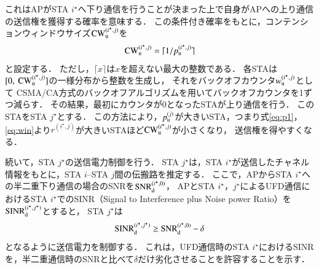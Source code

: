 \documentclass[master]{kuisthesis}		%
\begin{document}
			これはAPがSTA $i^{\star}$へ下り通信を行うことが決まった上で自身がAPへの上り通信の送信権を獲得する確率を意味する．
			この条件付き確率をもとに，コンテンションウィンドウサイズ${\rm CW}^{(i^{\star},j)}_{\rm u}$を
			\begin{equation}
				{\rm CW}^{(i^{\star},j)}_{\rm u} = \lceil 1/p_{\rm u}^{(i^{\star},j)} \rceil
			\end{equation}
			と設定する．
			ただし，$\lceil x \rceil$は$x$を超えない最大の整数である．
			各STAは$[0,\ {\rm CW}^{(i^{\star},j)}_{\rm u}]$の一様分布から整数を生成し，
			それをバックオフカウンタ$w_{\rm u}^{(i^{\star},j)}$として
			CSMA/CA方式のバックオフアルゴリズムを用いてバックオフカウンタを1ずつ減らす．
			その結果，最初にカウンタが0となったSTAが上り通信を行う．
			このSTAをSTA $j^{\star}$とする．
			この方法により，$p_{\rm u}^{(j)}$が大きいSTA，つまり式\eqref{eq:p1}，\eqref{eq:win}より$r^{(i^{\star},j)}$が大きいSTAほど${\rm CW}^{(i^{\star},j)}_{\rm u}$が小さくなり，
			送信権を得やすくなる．
			\par
			続いて，STA $j^{\star}$の送信電力制御を行う．
			STA $j^{\star}$は，STA $i^{\star}$が送信したチャネル情報をもとに，STA $i$--STA $j$間の伝搬路を推定する．
			ここで，APからSTA $i^{\star}$への半二重下り通信の場合のSNRを${\rm SNR}_{\rm d}^{(i^{\star},0)}$，
			APとSTA $i^{\star}$，$j^{\star}$によるUFD通信におけるSTA $i^{\star}$でのSINR（Signal to Interference plus Noise power Ratio）を${\rm SINR}_{\rm d}^{(i^{\star},j^{\star})}$とすると，
			STA $j^{\star}$は
			\begin{equation}
				{\rm SINR}_{\rm d}^{(i^{\star},j^{\star})} \geq {\rm SNR}_{\rm d}^{(i^{\star},0)} -\delta
			\end{equation}
			となるように送信電力を制御する．
			これは，UFD通信時のSTA $i^{\star}$におけるSINRを，半二重通信時のSNRと比べて$\delta$だけ劣化させることを許容することを示す．
\end{document}
